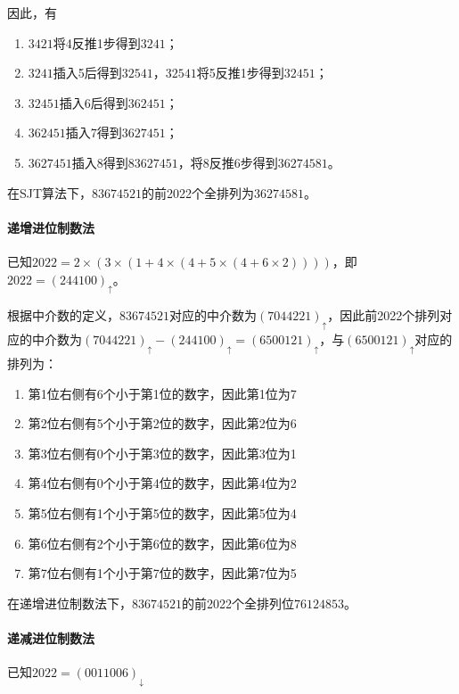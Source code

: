 \documentclass[UTF8]{ctexart}
\begin{document}
    因此，有

    \begin{enumerate}[label=\textit{第\arabic*步}, itemsep=0.2em]
        \item $3421$将4反推1步得到$3241$；
        \item $3241$插入5后得到$32541$，$32541$将5反推1步得到$32451$；
        \item $32451$插入6后得到$362451$；
        \item $362451$插入7得到$3627451$；
        \item $3627451$插入8得到$83627451$，将8反推6步得到$36274581$。
    \end{enumerate}

    在SJT算法下，$83674521$的前2022个全排列为$36274581$。

    \paragraph*{递增进位制数法}

    已知$2022 = 2\times \left(3\times \left(1 + 4\times \left(4 + 5\times \left( 4 + 6\times 2\right)\right)\right)\right)$，即$2022 = (244100)_\uparrow$。

    根据中介数的定义，$83674521$对应的中介数为$(7044221)_\uparrow$，因此前2022个排列对应的中介数为$(7044221)_\uparrow - (244100)_\uparrow = (6500121)_\uparrow$，与$(6500121)_\uparrow$对应的排列为：

    \begin{enumerate}[label=\textit{第\arabic*步}, itemsep=0.2em]
        \item 第1位右侧有6个小于第1位的数字，因此第1位为7
        \item 第2位右侧有5个小于第2位的数字，因此第2位为6
        \item 第3位右侧有0个小于第3位的数字，因此第3位为1
        \item 第4位右侧有0个小于第4位的数字，因此第4位为2
        \item 第5位右侧有1个小于第5位的数字，因此第5位为4
        \item 第6位右侧有2个小于第6位的数字，因此第6位为8
        \item 第7位右侧有1个小于第7位的数字，因此第7位为5
    \end{enumerate}

    在递增进位制数法下，$83674521$的前2022个全排列位$76124853$。

    \paragraph*{递减进位制数法} 已知$2022 = (0011006)_\downarrow$
    
\end{document}
